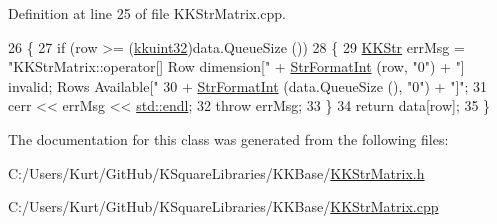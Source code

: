 Definition at line 25 of file K\+K\+Str\+Matrix.\+cpp.


\begin{DoxyCode}
26 \{
27   \textcolor{keywordflow}{if}  (row >= (\hyperlink{namespace_k_k_b_af8d832f05c54994a1cce25bd5743e19a}{kkuint32})data.QueueSize ())
28   \{
29     \hyperlink{class_k_k_b_1_1_k_k_str}{KKStr}  errMsg = \textcolor{stringliteral}{"KKStrMatrix::operator[]    Row dimension["} + 
      \hyperlink{namespace_k_k_b_ae3bde258fa036604fac8bdb0277ab46e}{StrFormatInt} (row, \textcolor{stringliteral}{"0"}) + \textcolor{stringliteral}{"] invalid;  Rows Available["} 
30       + \hyperlink{namespace_k_k_b_ae3bde258fa036604fac8bdb0277ab46e}{StrFormatInt} (data.QueueSize (), \textcolor{stringliteral}{"0"}) + \textcolor{stringliteral}{"]"};
31     cerr << errMsg << \hyperlink{namespace_k_k_b_ad1f50f65af6adc8fa9e6f62d007818a8}{std::endl};
32     \textcolor{keywordflow}{throw}  errMsg;
33   \}
34   \textcolor{keywordflow}{return}  data[row];
35 \}
\end{DoxyCode}


The documentation for this class was generated from the following files\+:\begin{DoxyCompactItemize}
\item 
C\+:/\+Users/\+Kurt/\+Git\+Hub/\+K\+Square\+Libraries/\+K\+K\+Base/\hyperlink{_k_k_str_matrix_8h}{K\+K\+Str\+Matrix.\+h}\item 
C\+:/\+Users/\+Kurt/\+Git\+Hub/\+K\+Square\+Libraries/\+K\+K\+Base/\hyperlink{_k_k_str_matrix_8cpp}{K\+K\+Str\+Matrix.\+cpp}\end{DoxyCompactItemize}
